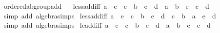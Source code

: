\begin{isabellebody}
\isanewline
\isanewline
{}\isamarkupfalse%
\ ordered{\isacharunderscore}{\kern0pt}ab{\isacharunderscore}{\kern0pt}group{\isacharunderscore}{\kern0pt}add%
\isadelimproof
\ %
\endisadelimproof
%
\isatagproof
\isacommand{{\isachardot}{\kern0pt}{\isachardot}{\kern0pt}}\isamarkupfalse%
%
\endisatagproof
{\isafoldproof}%
%
\isadelimproof
%
\endisadelimproof
\isanewline
\isanewline
{}\isamarkupfalse%
\ less{\isacharunderscore}{\kern0pt}add{\isacharunderscore}{\kern0pt}iff{}{\isacharcolon}{\kern0pt}\ {\isachardoublequoteopen}a\ {\isacharasterisk}{\kern0pt}\ e\ {\isacharplus}{\kern0pt}\ c\ {\isacharless}{\kern0pt}\ b\ {\isacharasterisk}{\kern0pt}\ e\ {\isacharplus}{\kern0pt}\ d\ {\isasymlongleftrightarrow}\ {\isacharparenleft}{\kern0pt}a\ {\isacharminus}{\kern0pt}\ b{\isacharparenright}{\kern0pt}\ {\isacharasterisk}{\kern0pt}\ e\ {\isacharplus}{\kern0pt}\ c\ {\isacharless}{\kern0pt}\ d{\isachardoublequoteclose}\isanewline
%
\isadelimproof
\ \ %
\endisadelimproof
%
\isatagproof
{}\isamarkupfalse%
\ {\isacharparenleft}{\kern0pt}simp\ add{\isacharcolon}{\kern0pt}\ algebra{\isacharunderscore}{\kern0pt}simps{\isacharparenright}{\kern0pt}%
\endisatagproof
{\isafoldproof}%
%
\isadelimproof
\isanewline
%
\endisadelimproof
\isanewline
{}\isamarkupfalse%
\ less{\isacharunderscore}{\kern0pt}add{\isacharunderscore}{\kern0pt}iff{}{\isacharcolon}{\kern0pt}\ {\isachardoublequoteopen}a\ {\isacharasterisk}{\kern0pt}\ e\ {\isacharplus}{\kern0pt}\ c\ {\isacharless}{\kern0pt}\ b\ {\isacharasterisk}{\kern0pt}\ e\ {\isacharplus}{\kern0pt}\ d\ {\isasymlongleftrightarrow}\ c\ {\isacharless}{\kern0pt}\ {\isacharparenleft}{\kern0pt}b\ {\isacharminus}{\kern0pt}\ a{\isacharparenright}{\kern0pt}\ {\isacharasterisk}{\kern0pt}\ e\ {\isacharplus}{\kern0pt}\ d{\isachardoublequoteclose}\isanewline
%
\isadelimproof
\ \ %
\endisadelimproof
%
\isatagproof
{}\isamarkupfalse%
\ {\isacharparenleft}{\kern0pt}simp\ add{\isacharcolon}{\kern0pt}\ algebra{\isacharunderscore}{\kern0pt}simps{\isacharparenright}{\kern0pt}%
\endisatagproof
{\isafoldproof}%
%
\isadelimproof
\isanewline
%
\endisadelimproof
\isanewline
{}\isamarkupfalse%
\ le{\isacharunderscore}{\kern0pt}add{\isacharunderscore}{\kern0pt}iff{}{\isacharcolon}{\kern0pt}\ {\isachardoublequoteopen}a\ {\isacharasterisk}{\kern0pt}\ e\ {\isacharplus}{\kern0pt}\ c\ {\isasymle}\ b\ {\isacharasterisk}{\kern0pt}\ e\ {\isacharplus}{\kern0pt}\ d\ {\isasymlongleftrightarrow}\ {\isacharparenleft}{\kern0pt}a\ {\isacharminus}{\kern0pt}\ b{\isacharparenright}{\kern0pt}\ {\isacharasterisk}{\kern0pt}\ e\ {\isacharplus}{\kern0pt}\ c\ {\isasymle}\ d{\isachardoublequoteclose}\isanewline

\end{isabellebody}
